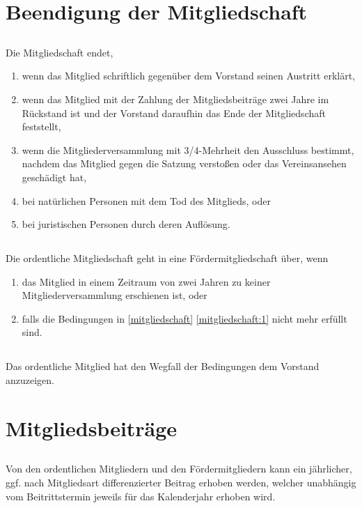 \documentclass[12pt]{article}
\begin{document}
\section{Beendigung der Mitgliedschaft}
\label{beendigung_der_mitgliedschaft}
\subsection{}
\label{beendigung_der_mitgliedschaft:1}
Die Mitgliedschaft endet,
\begin{enumerate}
    \item wenn das Mitglied schriftlich gegenüber dem Vorstand seinen Austritt erklärt,
    \item wenn das Mitglied mit der Zahlung der Mitgliedsbeiträge zwei Jahre im Rückstand ist und der Vorstand daraufhin das Ende der Mitgliedschaft feststellt,
    \item wenn die Mitgliederversammlung mit 3/4-Mehrheit den Ausschluss bestimmt, nachdem das Mitglied gegen die Satzung verstoßen oder das Vereinsansehen geschädigt hat,
    \item bei natürlichen Personen mit dem Tod des Mitglieds, oder
    \item bei juristischen Personen durch deren Auflösung.
\end{enumerate}
\subsection{}
Die ordentliche Mitgliedschaft geht in eine Fördermitgliedschaft über, wenn
\begin{enumerate}
    \item das Mitglied in einem Zeitraum von zwei Jahren zu keiner Mitgliederversammlung erschienen ist, oder
    \item falls die Bedingungen in \ref{mitgliedschaft} \ref{mitgliedschaft:1} nicht mehr erfüllt sind.
\end{enumerate}
\subsection{}
Das ordentliche Mitglied hat den Wegfall der Bedingungen dem Vorstand anzuzeigen.

\section{Mitgliedsbeiträge}
\subsection{}
Von den ordentlichen Mitgliedern und den Fördermitgliedern kann ein jährlicher, ggf. nach Mitgliedsart differenzierter Beitrag erhoben werden, welcher unabhängig vom Beitrittstermin jeweils für das Kalenderjahr erhoben wird.
\end{document}
